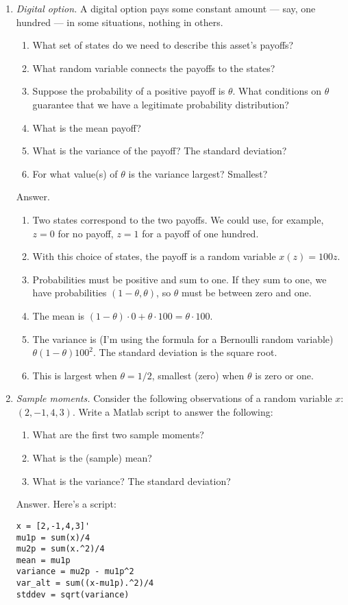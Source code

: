 \documentclass[11pt]{article}
\begin{document}
\begin{enumerate}
\item {\it Digital option.\/}
A digital option pays some constant amount --- say, one hundred ---
in some situations, nothing in others.
\begin{enumerate}
\item What set of states do we need to describe this asset's payoffs?
\item What random variable connects the payoffs to the states?
\item Suppose the probability of a positive payoff is $\theta$.
What conditions on $\theta$ guarantee that we have a legitimate probability distribution?
\item What is the mean payoff?
\item What is the variance of the payoff?
The standard deviation?
\item For what value(s) of $\theta$ is the variance largest?  Smallest?
\end{enumerate}
%
Answer.
\begin{enumerate}
\item Two states correspond to the two payoffs.  We could use, for example,
$z=0$ for no payoff, $z=1$ for a payoff of one hundred.
\item With this choice of states, the payoff is a random variable $x(z) = 100 z$.
\item Probabilities must be positive and sum to one.
If they sum to one, we have probabilities $(1-\theta, \theta)$,
so $\theta$ must be between zero and one.
\item The mean is $ (1-\theta) \cdot 0 + \theta \cdot 100 = \theta \cdot 100 $.
\item The variance is (I'm using the formula for a Bernoulli random variable)
$ \theta (1-\theta) 100^2$.
The standard deviation is the square root.
\item This is largest when $\theta = 1/2$, smallest (zero) when $\theta$ is zero or one.
\end{enumerate}

\item {\it Sample moments.\/}
Consider the following observations of a random variable $x$:
 $ (2, -1, 4, 3)$.
 Write a Matlab script to answer the following:
\begin{enumerate}
\item What are the first two sample moments?
\item What is the (sample) mean?
\item What is the variance?  The standard deviation?
\end{enumerate}
%
Answer.
Here's a script:
\begin{verbatim}
x = [2,-1,4,3]'
mu1p = sum(x)/4
mu2p = sum(x.^2)/4
mean = mu1p
variance = mu2p - mu1p^2
var_alt = sum((x-mu1p).^2)/4
stddev = sqrt(variance)
\end{verbatim}


\end{enumerate}
\end{document}
